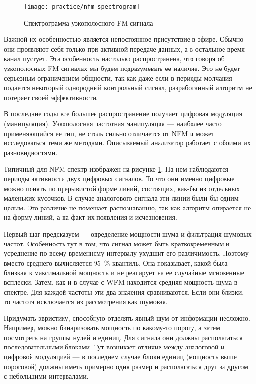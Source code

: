 \begin{figure}[h]
  \centering
  \texttt{[image: practice/nfm\_spectrogram]}
  \caption{Спектрограмма узкополосного FM сигнала}
  \label{fig:practice:nfm_spectrogram}
\end{figure}

Важной их особенностью является непостоянное присутствие в эфире. Обычно они проявляют себя только при активной передаче данных, а в остальное время канал пустует. Эта особенность настолько распространена, что говоря об узкополосных FM сигналах мы будем подразумевать ее наличие. Это не будет серьезным ограничением общности, так как даже если в периоды молчания подается некоторый однородный контрольный сигнал, разработанный алгоритм не потеряет своей эффективности.

В последние годы все большее распространение получает цифровая модуляция (манипуляция). Узкополосная частотная манипуляция --- наиболее часто применяющийся ее тип, не столь сильно отличается от NFM и может исследоваться теми же методами. Описываемый анализатор работает с обоими их разновидностями.

Типичный для NFM спектр изображен на рисунке \ref{fig:practice:nfm_spectrogram}. На нем наблюдаются периоды активности двух цифровых сигналов. То что они именно цифровые можно понять по прерывистой форме линий, состоящих, как-бы из отдельных маленьких кусочков. В случае аналогового сигнала эти линии были бы одним целым. Это различие не помешает распознаванию, так как алгоритм опирается не на форму линий, а на факт их появления и исчезновения.

Первый шаг предсказуем --- определение мощности шума и фильтрация шумовых частот. Особенность тут в том, что сигнал может быть кратковременным и усреднение по всему временному интервалу ухудшит его различимость. Поэтому вместо среднего вычисляется \SI{95}{\percent} квантиль. Она показывает, какой была близкая к максимальной мощность и не реагирует на ее случайные мгновенные всплески. Затем, как и в случае с WFM находится средняя мощность шума в спектре. Для каждой частоты эти два значения сравниваются. Если они близки, то частота исключается из рассмотрения как шумовая.

Придумать эвристику, способную отделять явный шум от информации несложно. Например, можно бинаризовать мощность по какому-то порогу, а затем посмотреть на группы нулей и единиц. Для сигнала они должны располагаться последовательными блоками. Тут возникает отличие между аналоговой и цифровой модуляцией --- в последнем случае блоки единиц (мощность выше пороговой) должны иметь примерно один размер и располагаться друг за другом с небольшими интервалами.


